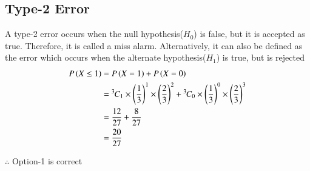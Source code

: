\documentclass[journal,12pt,twocolumn]{IEEEtran}
\begin{document}
\subsection{Type-2 Error}
A type-2 error occurs when the null hypothesis($H_0$) is false, but it is accepted as true. Therefore, it is called a miss alarm. Alternatively, it can also be defined as the error which occurs when the alternate hypothesis($H_1$) is true, but is rejected
\begin{align}
P\left(X \leq 1\right) &= P\left(X=1\right) + P\left(X=0\right) \\
&= {{}^{3}\mkern-1muC_{1}} \times \left(\frac{1}{3}\right)^{1} \times  \left(\frac{2}{3}\right) ^{2} + {{}^{3}\mkern-1muC_{0}} \times \left(\frac{1}{3}\right)^{0} \times  \left(\frac{2}{3}\right) ^{3} \\
&= \frac{12}{27} + \frac{8}{27} \\
&= \frac{20}{27} 
\end{align}


$\therefore$ Option-1 is correct
\end{document}
